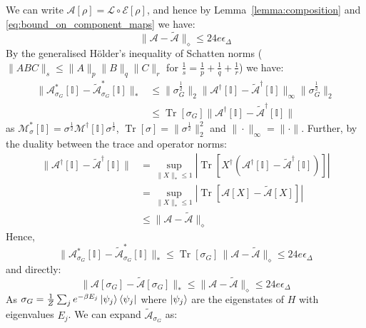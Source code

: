 We can write $\mathcal{A}[\rho] = \mathcal{L} \circ \mathcal{E}[\rho]$, and hence by Lemma~\ref{lemma:composition} and \eqref{eq:bound_on_component_maps} we have:
\begin{equation}
    \|\mathcal{A} - \tilde{\mathcal{A}}\|_{\diamond} \leq 24e \epsilon_{\Delta}
\end{equation}
By the generalised H\"older's inequality of Schatten norms ($\|ABC\|_s \leq \|A\|_p\|B\|_q\|C\|_r$ for $\frac{1}{s} = \frac{1}{p}+ \frac{1}{q} + \frac{1}{r}$) we have:
\begin{align}
    \|\mathcal{A}^*_{\sigma_G}[\mathbb{I}] - \tilde{\mathcal{A}}^*_{\sigma_G}[\mathbb{I}]\|_* &\leq \|\sigma_G^{\frac{1}{2}}\|_2\|\mathcal{A}^{\dagger}[\mathbb{I}] - \tilde{\mathcal{A}}^{\dagger}[\mathbb{I}]\|_{\infty} \|\sigma_G^{\frac{1}{2}}\|_2\\
    &\leq \operatorname{Tr}[\sigma_G]\|\mathcal{A}^{\dagger}[\mathbb{I}] - \tilde{\mathcal{A}}^{\dagger}[\mathbb{I}]\|
\end{align}
as $\mathcal{M}^*_{\sigma}[\mathbb{I}] = \sigma^{\frac{1}{2}}\mathcal{M}^{\dagger}[\mathbb{I}]\sigma^{\frac{1}{2}}$, $\operatorname{Tr}[\sigma] = \|\sigma^{\frac{1}{2}}\|_2^2$ and $\|\cdot\|_{\infty}= \|\cdot\|$. Further, by the duality between the trace and operator norms: 
\begin{align}
    \|\mathcal{A}^{\dagger}[\mathbb{I}]- \tilde{\mathcal{A}}^{\dagger}[\mathbb{I}]\| &= \sup_{\|X\|_* \leq 1} |\operatorname{Tr}[X^{\dagger}(\mathcal{A}^{\dagger}[\mathbb{I}]- \tilde{\mathcal{A}}^{\dagger}[\mathbb{I}]) ]|\\
    &= \sup_{\|X\|_* \leq 1}|\operatorname{Tr}[\mathcal{A}[X]- \tilde{\mathcal{A}}[X] ]|\\
    &\leq \|\mathcal{A}- \tilde{\mathcal{A}}\|_{\diamond}
\end{align}
Hence,
\begin{equation}
    \|\mathcal{A}^*_{\sigma_G}[\mathbb{I}] - \tilde{\mathcal{A}}^*_{\sigma_G}[\mathbb{I}]\|_* \leq \operatorname{Tr}[\sigma_G]\,\|\mathcal{A}- \tilde{\mathcal{A}}\|_{\diamond} \leq 24e\epsilon_{\Delta}
    \label{eq:AAtildeclose1}
\end{equation}
and directly:
\begin{equation}
    \|\mathcal{A}[\sigma_G] - \tilde{\mathcal{A}}[\sigma_G]\|_* \leq \|\mathcal{A}-\tilde{\mathcal{A}}\|_{\diamond} \leq 24e\epsilon_{\Delta}
    \label{eq:AAtildeclose2}
\end{equation}
As $\sigma_G = \frac{1}{Z}\sum_j e^{-\beta E_j} \ket{\psi_j}\bra{\psi_j}$ where $\ket{\psi_j}$ are the eigenstates of $H$ with eigenvalues $E_j$. We can expand $\tilde{\mathcal{A}}_{\sigma_G}$ as:
